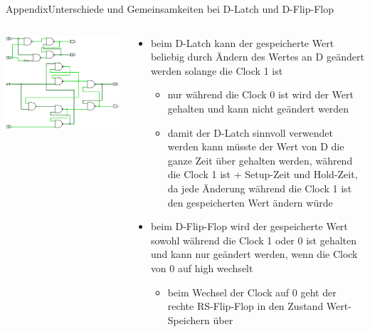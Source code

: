 \begin{frame}{Appendix}{Unterschiede und Gemeinsamkeiten bei D-Latch und D-Flip-Flop}
  \begin{columns}
    \begin{column}{0.4\textwidth}
      \includegraphics[width=0.6\paperheight, center]{./figures/01X.png}
    \end{column}
    \begin{column}{0.6\textwidth}
      \begin{itemize}
        \item beim D-Latch kann der gespeicherte Wert beliebig durch \alert{Ändern} des Wertes an D geändert werden solange die \alert{Clock 1} ist 
        \begin{itemize}
          \item nur während die \alert{Clock 0} ist wird der Wert gehalten und kann \alert{nicht geändert} werden
          \item damit der D-Latch sinnvoll verwendet werden kann müsste der Wert von D die \alert{ganze Zeit} über gehalten werden, während die Clock 1 ist + \alert{Setup-Zeit} und \alert{Hold-Zeit}, da jede Änderung während die \alert{Clock 1} ist den gespeicherten Wert ändern würde
        \end{itemize}
      \item beim D-Flip-Flop wird der gespeicherte Wert sowohl während die \alert{Clock 1 oder 0} ist gehalten und kann nur geändert werden, wenn die Clock von 0 auf high wechselt
      \begin{itemize}
        \item beim Wechsel der Clock auf 0 geht der \alert{rechte RS-Flip-Flop} in den Zustand \alert{Wert-Speichern} über
      \end{itemize}
      \end{itemize}
    \end{column}
  \end{columns}
\end{frame}

